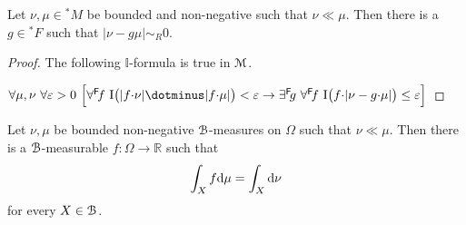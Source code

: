 \documentclass[11pt,oneside]{amsart}
\begin{document}
\begin{proposition} 
  Let $\nu,\mu\in{}^*\!M$ be bounded and non-negative such that  $\nu\ll\mu$.
  Then there is a $g\in{}^*\!F$ such that $|\nu-g\mu|\sim_R0$.
\end{proposition}

\begin{proof}
  The following $\mathds{I}$-formula is true in ${\EuScript M}$.
  
  $
\forall\mu,\nu\ \forall\varepsilon>0\ \Big[\forall^{\sf F}\!f\ {\rm I}\big(|f{\cdot}\nu|\dotminus|f{\cdot}\mu|\big)<\varepsilon \rightarrow \exists^{\sf F}\!g\ \forall^{\sf F}\! f\ {\rm I}\big(f{\cdot}|\nu-g{\cdot}\mu|\big)\le\varepsilon\Big]$


\end{proof}

\begin{theorem} 
  Let $\nu,\mu$ be bounded non-negative ${\EuScript B}$-measures on $\Omega$ such that $\nu\ll\mu$.
  Then there is a ${\EuScript B}$-measurable $f:\Omega\to\mathds{R}$ such that 
  $$
  \int_X f{\rm d}\mu = \int_X {\rm d}\nu
  $$
  for every $X\in{\EuScript B}$.
\end{theorem}
\end{document}
